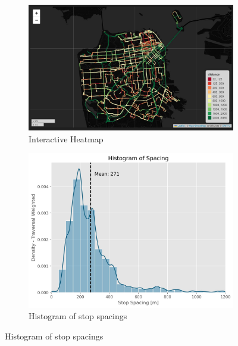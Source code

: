 \documentclass[preview]{standalone}
\begin{document}
\begin{figure}[!h]
    \centering
    \begin{subfigure}[]{0.75\textwidth}
      \centering
      \includegraphics[width=\textwidth]{heatmap_interactive.jpg}
      \caption{Interactive Heatmap}
      \label{fig:div}
      \end{subfigure}
    \begin{subfigure}[]{0.8\textwidth}
      \centering
      \includegraphics[width=\textwidth]{hist.jpg}
      \caption{Histogram of stop spacings}
      \label{fig:hist}
    \end{subfigure}
\end{figure}
\end{document}
